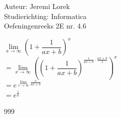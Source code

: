 \documentclass[a4paper]{article}
\begin{document}
  
\noindent \large Auteur: Jeremi Lorek \\
\noindent \large Studierichting:  Informatica\\
\noindent \large Oefeningenreeks 2E nr. 4.6\\

\medskip

\normalsize

$\lim\limits_{x \to \infty} \left( 1 + \dfrac{1}{ax + b} \right)^x$  \\

$= \lim\limits_{x \to \infty} \left( \left( 1 + \dfrac{1}{ax + b} \right)^{\tfrac{1}{ax + b} \cdot \tfrac{ax + b}{1}} \right)^x$  \\

$= e^{\lim\limits_{x \to \infty} \tfrac{x}{ax + b}}$  \\

$= e^{\tfrac{1}{a}}$  \\


\begin{thebibliography}{999}
\end{thebibliography}
\end{document}
